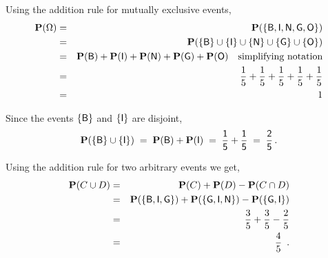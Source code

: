 \begin{ExerciseList}

Using the addition rule for mutually exclusive events,
\begin{eqnarray*}
\mathbf{P}(\Omega)
&=& \mathbf{P}(\mathsf{\{B,I,N,G,O\}})\\
&=& \mathbf{P}(\{\sf{B}\} \cup\{\sf{I}\}\cup \{\sf{N}\} \cup \{\sf{G}\} \cup \{\sf{O}\})\\
&=& \mathbf{P}(\sf B)+\mathbf{P}(\sf I)+\mathbf{P}(\sf N)+\mathbf{P}(\sf G)+\mathbf{P}(\sf O) \quad \text{simplifying notation} \\
&=& \frac{1}{5}+\frac{1}{5}+\frac{1}{5}+\frac{1}{5}+\frac{1}{5}\\
&=& 1
\end{eqnarray*}

\item Since the   events $\{\sf B\}$ and $\{\sf I\}$ are disjoint,
$$
\mathbf{P}(\{\sf{B}\} \cup \{\sf{I}\})\;=\;\mathbf{P}(\sf B)+\mathbf{P}(\sf I)\;=\;\frac{1}{5}+\frac{1}{5}\;=\;\frac{2}{5}\,.
$$


\medskip


\item  Using the addition rule for two arbitrary events we get,
\begin{eqnarray*}
\mathbf{P}(C \cup D) &=& \mathbf{P}(C)+\mathbf{P}(D)-\mathbf{P}(C\cap D)\\& =& \mathbf{P}(\{\sf{B},\sf{I},\sf{G}\}) + \mathbf{P}(\{\sf{G},\sf{I},\sf{N}\}) - \mathbf{P}(\{\sf{G},\sf{I}\})\\
& =& \frac{3}{5} +\frac{3}{5} - \frac{2}{5}\\& = &\frac{4}{5} \enspace .
\end{eqnarray*}
\ee


\end{ExerciseList}



